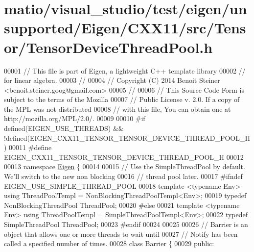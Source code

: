 \hypertarget{matio_2visual__studio_2test_2eigen_2unsupported_2_eigen_2_c_x_x11_2src_2_tensor_2_tensor_device_thread_pool_8h_source}{}\section{matio/visual\+\_\+studio/test/eigen/unsupported/\+Eigen/\+C\+X\+X11/src/\+Tensor/\+Tensor\+Device\+Thread\+Pool.h}
\label{matio_2visual__studio_2test_2eigen_2unsupported_2_eigen_2_c_x_x11_2src_2_tensor_2_tensor_device_thread_pool_8h_source}

\begin{DoxyCode}
00001 \textcolor{comment}{// This file is part of Eigen, a lightweight C++ template library}
00002 \textcolor{comment}{// for linear algebra.}
00003 \textcolor{comment}{//}
00004 \textcolor{comment}{// Copyright (C) 2014 Benoit Steiner <benoit.steiner.goog@gmail.com>}
00005 \textcolor{comment}{//}
00006 \textcolor{comment}{// This Source Code Form is subject to the terms of the Mozilla}
00007 \textcolor{comment}{// Public License v. 2.0. If a copy of the MPL was not distributed}
00008 \textcolor{comment}{// with this file, You can obtain one at http://mozilla.org/MPL/2.0/.}
00009 
00010 \textcolor{preprocessor}{#if defined(EIGEN\_USE\_THREADS) && !defined(EIGEN\_CXX11\_TENSOR\_TENSOR\_DEVICE\_THREAD\_POOL\_H)}
00011 \textcolor{preprocessor}{#define EIGEN\_CXX11\_TENSOR\_TENSOR\_DEVICE\_THREAD\_POOL\_H}
00012 
00013 \textcolor{keyword}{namespace }\hyperlink{namespace_eigen}{Eigen} \{
00014 
00015 \textcolor{comment}{// Use the SimpleThreadPool by default. We'll switch to the new non blocking}
00016 \textcolor{comment}{// thread pool later.}
00017 \textcolor{preprocessor}{#ifndef EIGEN\_USE\_SIMPLE\_THREAD\_POOL}
00018 \textcolor{keyword}{template} <\textcolor{keyword}{typename} Env> \textcolor{keyword}{using} ThreadPoolTempl = NonBlockingThreadPoolTempl<Env>;
00019 \textcolor{keyword}{typedef} NonBlockingThreadPool ThreadPool;
00020 \textcolor{preprocessor}{#else}
00021 \textcolor{keyword}{template} <\textcolor{keyword}{typename} Env> \textcolor{keyword}{using} ThreadPoolTempl = SimpleThreadPoolTempl<Env>;
00022 \textcolor{keyword}{typedef} SimpleThreadPool ThreadPool;
00023 \textcolor{preprocessor}{#endif}
00024 
00025 
00026 \textcolor{comment}{// Barrier is an object that allows one or more threads to wait until}
00027 \textcolor{comment}{// Notify has been called a specified number of times.}
00028 \textcolor{keyword}{class }Barrier \{
00029  \textcolor{keyword}{public}:

\end{DoxyCode}
